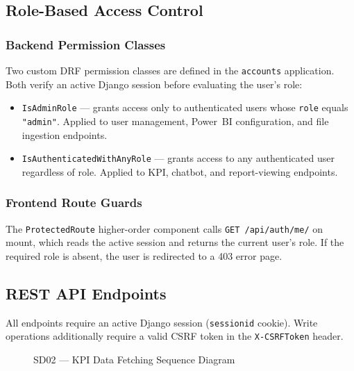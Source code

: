 \begin{sloppypar}
\subsection{Role-Based Access Control}

\subsubsection{Backend Permission Classes}

Two custom DRF permission classes are defined in the \texttt{accounts}
application. Both verify an active Django session before evaluating the user's
role:

\begin{itemize}
  \item \texttt{IsAdminRole} --- grants access only to authenticated users whose
    \texttt{role} equals \texttt{"admin"}. Applied to user management,
    Power~BI configuration, and file ingestion endpoints.
  \item \texttt{IsAuthenticatedWithAnyRole} --- grants access to any
    authenticated user regardless of role. Applied to KPI, chatbot, and
    report-viewing endpoints.
\end{itemize}

\subsubsection{Frontend Route Guards}

The \texttt{ProtectedRoute} higher-order component calls
\texttt{GET /api/auth/me/} on mount, which reads the active session and returns
the current user's role. If the required role is absent, the user is redirected
to a 403 error page.

\subsection{REST API Endpoints}

All endpoints require an active Django session (\texttt{sessionid} cookie).
Write operations additionally require a valid CSRF token in the
\texttt{X-CSRFToken} header.

\begin{figure}[H]
  \centering
  \caption{SD02 --- KPI Data Fetching Sequence Diagram}
  \label{fig:sd02_kpi}
\end{figure}


\end{sloppypar}
